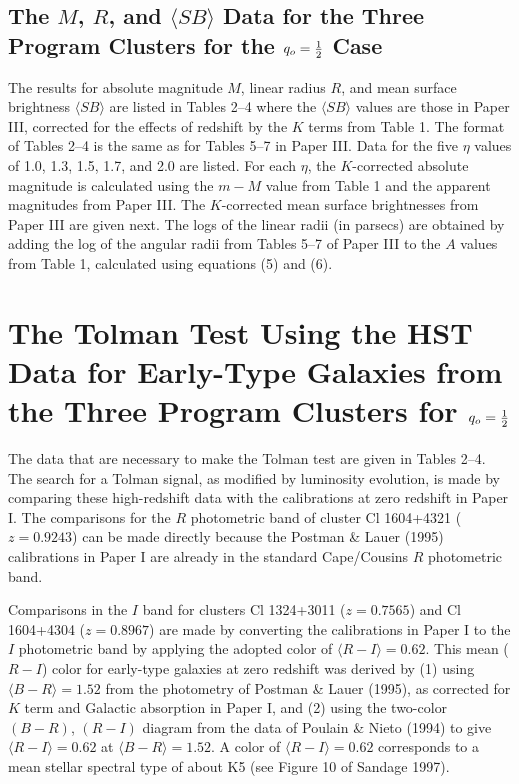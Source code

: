 \documentclass[preprint]{aastex}
\begin{document}
\subsection{The $M$, $R$, and $\langle SB \rangle$ Data for the Three 
Program Clusters for the $q_o = {1\over{2}}$ Case}

The results for absolute magnitude $M$, linear radius $R$, and mean
surface brightness $\langle SB \rangle$ are listed in Tables 2--4
where the $\langle SB \rangle$ values are those in Paper III,
corrected for the effects of redshift by the $K$ terms from Table 1.
The format of Tables 2--4 is the same as for Tables 5--7 in Paper
III. Data for the five $\eta$ values of 1.0, 1.3, 1.5, 1.7, and 2.0
are listed. For each $\eta$, the $K$-corrected absolute magnitude is
calculated using the $m - M$ value from Table 1 and the apparent
magnitudes from Paper III. The $K$-corrected mean surface brightnesses
from Paper III are given next. The logs of the linear radii (in
parsecs) are obtained by adding the log of the angular radii from
Tables 5--7 of Paper III to the $A$ values from Table 1, calculated
using equations (5) and (6).

\section{The Tolman Test Using the HST Data for Early-Type Galaxies from
the Three Program Clusters for $q_o = {1\over{2}}$}


The data that are necessary to make the Tolman test are given in
Tables 2--4. The search for a Tolman signal, as modified by luminosity
evolution, is made by comparing these high-redshift data with the
calibrations at zero redshift in Paper I. The comparisons for the $R$
photometric band of cluster Cl 1604+4321 ($z = 0.9243$) can be made
directly because the Postman \& Lauer (1995) calibrations in Paper I
are already in the standard Cape/Cousins $R$ photometric band.

Comparisons in the $I$ band for clusters Cl 1324+3011 ($z = 0.7565$)
and Cl 1604+4304 ($z = 0.8967$) are made by converting the
calibrations in Paper I to the $I$ photometric band by applying the
adopted color of $\langle R-I\rangle = 0.62$. This mean ($R-I$) color
for early-type galaxies at zero redshift was derived by (1) using
$\langle B-R \rangle = 1.52$ from the photometry of Postman \& Lauer
(1995), as corrected for $K$ term and Galactic absorption in Paper I,
and (2) using the two-color $(B-R)$, $(R-I)$ diagram from the data of
Poulain \& Nieto (1994) to give $\langle R-I \rangle = 0.62$ at
$\langle B-R \rangle = 1.52$. A color of $\langle R-I \rangle = 0.62$
corresponds to a mean stellar spectral type of about K5 (see Figure 10
of Sandage 1997).
          
\end{document}
